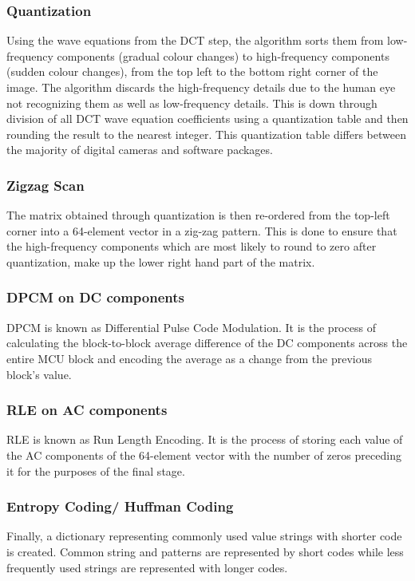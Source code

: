 \subsubsection{Quantization}
Using the wave equations from the DCT step,
the algorithm sorts them from low-frequency
components (gradual colour changes) to 
high-frequency components (sudden colour changes),
from the top left to the bottom right corner of the image.
The algorithm discards the high-frequency details
due to the human eye not recognizing them as
well as low-frequency details. This is down through 
division of all DCT wave equation 
coefficients using a quantization table and
then rounding the result to the nearest integer.
This quantization table differs between
the majority of digital cameras and 
software packages.\cite{hass_impulse_jpeg}

\subsubsection{Zigzag Scan}
The matrix obtained through quantization is
then re-ordered from the top-left corner into a 
64-element vector in a zig-zag pattern.
This is done to ensure that the high-frequency
components which are most likely to round to
zero after quantization, make up the lower
right hand part of the matrix.\cite{hass_impulse_jpeg}

\subsubsection{DPCM on DC components}
DPCM is known as Differential Pulse
Code Modulation. It is the process of
calculating the block-to-block average difference
of the DC components across the entire MCU block
and encoding the average as a change from the 
previous block's value.\cite{hass_impulse_jpeg}

\subsubsection{RLE on AC components}
RLE is known as Run Length Encoding. It is the process of
storing each value of the AC components of the
64-element vector with the number of zeros
preceding it for the purposes of the final stage.\cite{hass_impulse_jpeg}

\subsubsection{Entropy Coding/ Huffman Coding}
Finally, a dictionary representing commonly used value strings with
shorter code is created. Common string and patterns
are represented by short codes while less frequently
used strings are represented with longer codes.

